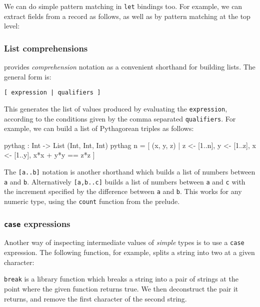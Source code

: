 \noindent
We can do simple pattern matching in \texttt{let} bindings too.
For example, we can extract fields from a record as follows, as well as by pattern matching at the top level:

 
\subsubsection*{List comprehensions}
\label{sec:listcomp}

\Idris{} provides \emph{comprehension} notation as a convenient shorthand for building lists.
The general form is:

\begin{lstlisting}[style=stdout]
[ expression | qualifiers ]
\end{lstlisting}
 
\noindent
This generates the list of values produced by evaluating the \texttt{expression}, according to the conditions given by the comma separated \texttt{qualifiers}.
For example, we can build a list of Pythagorean triples as follows:

\begin{code}
pythag : Int -> List (Int, Int, Int)
pythag n = [ (x, y, z) | z <- [1..n], y <- [1..z], x <- [1..y],
                         x*x + y*y == z*z ]
\end{code}
 

\noindent
The \texttt{[a..b]} notation is another shorthand which builds a list of numbers between \texttt{a} and \texttt{b}.
Alternatively \texttt{[a,b..c]} builds a list of numbers between \texttt{a} and \texttt{c} with the increment specified by the difference between \texttt{a} and \texttt{b}.
This works for any numeric type, using the \texttt{count} function from the prelude. 

\subsubsection*{\texttt{case} expressions}

Another way of inspecting intermediate values of \emph{simple} types
is to use a \texttt{case} expression.
The following function, for example, splits a string into two at a given character:


\noindent
\texttt{break} is a library function which breaks a string into a pair of strings
at the point where the given function returns true.
We then deconstruct the pair it returns, and remove the first character of the second string.

